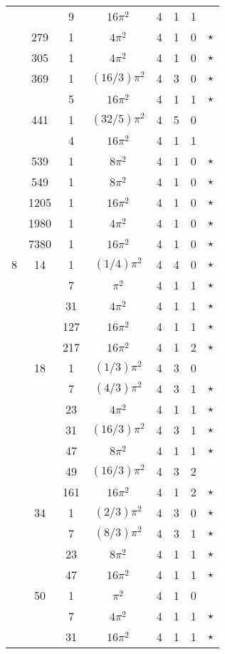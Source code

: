 \begin{tabular}{ccc|ccccc}
 &  & 9 & $16\pi^2$ & 4 & 1 & 1 &  \\
 & 279 & 1 & $4\pi^2$ & 4 & 1 & 0 & $\star$ \\
 & 305 & 1 & $4\pi^2$ & 4 & 1 & 0 & $\star$ \\
 & 369 & 1 & $(16/3)\pi^2$ & 4 & 3 & 0 & $\star$ \\
 &  & 5 & $16\pi^2$ & 4 & 1 & 1 & $\star$ \\
 & 441 & 1 & $(32/5)\pi^2$ & 4 & 5 & 0 &  \\
 &  & 4 & $16\pi^2$ & 4 & 1 & 1 &  \\
 & 539 & 1 & $8\pi^2$ & 4 & 1 & 0 & $\star$ \\
 & 549 & 1 & $8\pi^2$ & 4 & 1 & 0 & $\star$ \\
 & 1205 & 1 & $16\pi^2$ & 4 & 1 & 0 & $\star$ \\
 & 1980 & 1 & $4\pi^2$ & 4 & 1 & 0 & $\star$ \\
 & 7380 & 1 & $16\pi^2$ & 4 & 1 & 0 & $\star$ \\
8 & 14 & 1 & $(1/4)\pi^2$ & 4 & 4 & 0 & $\star$ \\
 &  & 7 & $\pi^2$ & 4 & 1 & 1 & $\star$ \\
 &  & 31 & $4\pi^2$ & 4 & 1 & 1 & $\star$ \\
 &  & 127 & $16\pi^2$ & 4 & 1 & 1 & $\star$ \\
 &  & 217 & $16\pi^2$ & 4 & 1 & 2 & $\star$ \\
 & 18 & 1 & $(1/3)\pi^2$ & 4 & 3 & 0 &  \\
 &  & 7 & $(4/3)\pi^2$ & 4 & 3 & 1 & $\star$ \\
 &  & 23 & $4\pi^2$ & 4 & 1 & 1 & $\star$ \\
 &  & 31 & $(16/3)\pi^2$ & 4 & 3 & 1 & $\star$ \\
 &  & 47 & $8\pi^2$ & 4 & 1 & 1 & $\star$ \\
 &  & 49 & $(16/3)\pi^2$ & 4 & 3 & 2 &  \\
 &  & 161 & $16\pi^2$ & 4 & 1 & 2 & $\star$ \\
 & 34 & 1 & $(2/3)\pi^2$ & 4 & 3 & 0 & $\star$ \\
 &  & 7 & $(8/3)\pi^2$ & 4 & 3 & 1 & $\star$ \\
 &  & 23 & $8\pi^2$ & 4 & 1 & 1 & $\star$ \\
 &  & 47 & $16\pi^2$ & 4 & 1 & 1 & $\star$ \\
 & 50 & 1 & $\pi^2$ & 4 & 1 & 0 &  \\
 &  & 7 & $4\pi^2$ & 4 & 1 & 1 & $\star$ \\
 &  & 31 & $16\pi^2$ & 4 & 1 & 1 & $\star$ \\

\end{tabular}
